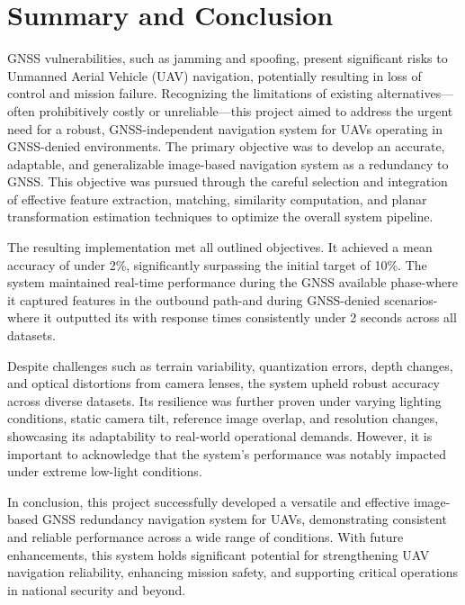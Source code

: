 \graphicspath{{conclusion/fig/}}

\chapter{Summary and Conclusion}
\label{chap:conclusion}

\vspace{-1cm}


GNSS vulnerabilities, such as jamming and spoofing, present significant risks to Unmanned Aerial Vehicle (UAV) navigation, potentially resulting in loss of control and mission failure. Recognizing the limitations of existing alternatives—often prohibitively costly or unreliable—this project aimed to address the urgent need for a robust, GNSS-independent navigation system for UAVs operating in GNSS-denied environments. The primary objective was to develop an accurate, adaptable, and generalizable image-based navigation system as a redundancy to GNSS. This objective was pursued through the careful selection and integration of effective feature extraction, matching, similarity computation, and planar transformation estimation techniques to optimize the overall system pipeline.

The resulting implementation met all outlined objectives. It achieved a mean accuracy of under 2\%, significantly surpassing the initial target of 10\%. The system maintained real-time performance during the GNSS available phase-where it captured features in the outbound path-and during GNSS-denied scenarios-where it outputted its with response times consistently under 2 seconds across all datasets.

Despite challenges such as terrain variability, quantization errors, depth changes, and optical distortions from camera lenses, the system upheld robust accuracy across diverse datasets. Its resilience was further proven under varying lighting conditions, static camera tilt, reference image overlap, and resolution changes, showcasing its adaptability to real-world operational demands. However, it is important to acknowledge that the system’s performance was notably impacted under extreme low-light conditions.

In conclusion, this project successfully developed a versatile and effective image-based GNSS redundancy navigation system for UAVs, demonstrating consistent and reliable performance across a wide range of conditions. With future enhancements, this system holds significant potential for strengthening UAV navigation reliability, enhancing mission safety, and supporting critical operations in national security and beyond.



